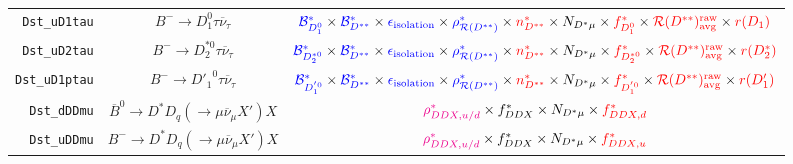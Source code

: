 \begin{landscape}
\begin{table}
\begin{tabular}{r|c|c}
  \texttt{Dst\_uD1tau} &                 $B^- \rightarrow D_1^0 \tau \overline{\nu}_\tau$                  &     $\textcolor{blue}{\mathcal{B}^{*}_{D_1^0}} \times \textcolor{blue}{\mathcal{B}^*_{D^{**}}} \times \textcolor{blue}{\epsilon_\text{isolation}} \times \textcolor{blue}{\rho_{\mathcal{R}(D^{**})}^*} \times \textcolor{red}{n^{*}_{D^{**}}} \times N_{D^* \mu} \times \textcolor{red}{f^{*}_{D_1^0}} \times \textcolor{red}{\mathcal{R}(D^{**})_\text{avg}^\text{raw}} \times \textcolor{red}{r({D_1})}$     \\
  \texttt{Dst\_uD2tau} &                $B^- \rightarrow D_2^{*0} \tau \overline{\nu}_\tau$                & $\textcolor{blue}{\mathcal{B}^{*}_{D_2^{*0}}} \times \textcolor{blue}{\mathcal{B}^*_{D^{**}}} \times \textcolor{blue}{\epsilon_\text{isolation}} \times \textcolor{blue}{\rho_{\mathcal{R}(D^{**})}^*} \times \textcolor{red}{n^{*}_{D^{**}}} \times N_{D^* \mu} \times \textcolor{red}{f^{*}_{D_2^{*0}}} \times \textcolor{red}{\mathcal{R}(D^{**})_\text{avg}^\text{raw}} \times \textcolor{red}{r({D_2^*})}$ \\
 \texttt{Dst\_uD1ptau} &                $B^- \rightarrow {D'_1}^0 \tau \overline{\nu}_\tau$                & $\textcolor{blue}{\mathcal{B}^{*}_{D_1^{'0}}} \times \textcolor{blue}{\mathcal{B}^*_{D^{**}}} \times \textcolor{blue}{\epsilon_\text{isolation}} \times \textcolor{blue}{\rho_{\mathcal{R}(D^{**})}^*} \times \textcolor{red}{n^{*}_{D^{**}}} \times N_{D^* \mu} \times \textcolor{red}{f^{*}_{D_1^{'0}}} \times \textcolor{red}{\mathcal{R}(D^{**})_\text{avg}^\text{raw}} \times \textcolor{red}{r({D'_1})}$  \\
   \texttt{Dst\_dDDmu} &  $\overline{B}^0 \rightarrow D^* D_q (\rightarrow \mu \overline{\nu}_\mu X') X$   &                                                                                                                                                 $\textcolor{magenta}{\rho^*_{DDX,u/d}} \times f^*_{DDX} \times N_{D^* \mu} \times \textcolor{red}{f^*_{DDX,d}}$                                                                                                                                                 \\
   \texttt{Dst\_uDDmu} &        $B^- \rightarrow D^* D_q (\rightarrow \mu \overline{\nu}_\mu X') X$        &                                                                                                                                                 $\textcolor{magenta}{\rho^*_{DDX,u/d}} \times f^*_{DDX} \times N_{D^* \mu} \times \textcolor{red}{f^*_{DDX,u}}$                                                                                                                                                 \\

\end{tabular}
\end{table}
\end{landscape}
